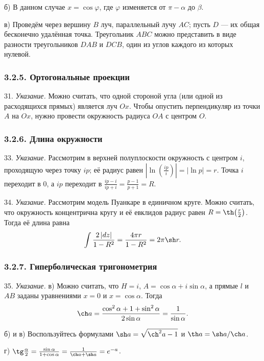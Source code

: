 	б) В данном случае $x = \cos\varphi$, где $\varphi$ изменяется от $\pi - \alpha$ до $\beta$.

	в) Проведём через вершину $B$ луч, параллельный лучу $AC$; пусть $D$ --- их общая бесконечно удалённая точка. Треугольник $ABC$ можно представить в виде разности треугольников $DAB$ и $DCB$, один из углов каждого из которых нулевой.
 
	\subsubsection{3.2.5. Ортогональные проекции}
 
	31. \textit{Указание.} Можно считать, что одной стороной угла (или одной из расходящихся прямых) является луч $Ox$. Чтобы опустить перпендикуляр из точки $A$ на $Ox$, нужно провести окружность радиуса $OA$ с центром $O$.
 
	\subsubsection{3.2.6. Длина окружности}
 
	33. \textit{Указание.} Рассмотрим в верхней полуплоскости окружность с центром $i$, проходящую через точку $ip$; её радиус равен $|\ln(\frac{ip}{i})| = |\ln p| = r$. Точка $i$ переходит в $0$, а $ip$ переходит в $\frac{ip - i}{ip + i} = \frac{p - 1}{p + 1} = R$.
 
	34. \textit{Указание.} Рассмотрим модель Пуанкаре в единичном круге. Можно считать, что окружность концентрична кругу и её евклидов радиус равен $R = \th\!\left(\frac{r}{2}\right)$. Тогда её длина равна
	\[
		\int \frac{2\,|dz|}{1 - R^2} = \frac{4\pi r}{1 - R^2} = 2\pi \sh r.
	\]
 
	\subsubsection{3.2.7. Гиперболическая тригонометрия}
 
	35. \textit{Указание.} в) Можно считать, что $H = i$, $A = \cos\alpha + i\sin\alpha$, а прямые $l$ и $AB$ заданы уравнениями $x = 0$ и $x = \cos\alpha$. Тогда
	\[
		\ch a = \frac{\cos^2\alpha + 1 + \sin^2\alpha}{2\sin\alpha} = \frac{1}{\sin\alpha}.
	\]

	б) и в) Воспользуйтесь формулами $\sh a = \sqrt{\ch^2 a - 1}$ и $\th a = \sh a / \ch a$.

	г) $\tg\frac{\alpha}{2} = \frac{\sin\alpha}{1 + \cos\alpha} = \frac{1}{\ch a + \sh a} = e^{-a}$.

